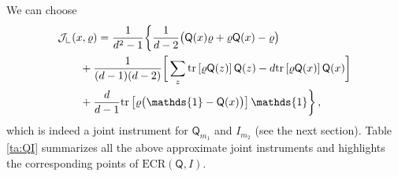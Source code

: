 \documentclass[12pt,reqno]{amsart}
\theoremstyle{definition}
\newcommand{\tr}[1]{{\rm tr}\left[#1\right]} %
\newcommand{\id}{\mathds{1}} %
\newcommand{\Qo}{\mathsf{Q}}%
\newcommand{\Lcorner}{{\mathchoice{\mathrel{\makebox[7pt][c]{\rule{.4pt}{7.5pt}\rule{5pt}{.4pt}}}}{\mathrel{\makebox[7pt][c]{\rule{.4pt}{7.5pt}\rule{5pt}{.4pt}}}}{\mathrel{\makebox[5.5pt][c]{\rule{.4pt}{5.25pt}\rule{3.5pt}{.4pt}}}}{\mathrel{\makebox[4pt][c]{\rule{.4pt}{3.75pt}\rule{2.5pt}{.4pt}}}}}}
\newcommand{\rhoo}{\varrho} %
\newcommand{\ii}{\mathcal{J}}
\newcommand{\ECR}[1]{\textrm{ECR} #1} %
\begin{document}
We can choose
\begin{equation}\label{eq:Jcorner}
\begin{aligned}
& \ii_\Lcorner(x,\rhoo) = \frac{1}{d^2-1} \bigg\{ \frac{1}{d-2}\big(\Qo(x)\rhoo+\rhoo\Qo(x)-\rhoo\big) \\
& \qquad + \frac{1}{(d-1)(d-2)}\bigg[ \sum_z\tr{\rhoo\Qo(z)}\Qo(z) - d\tr{\rhoo\Qo(x)}\Qo(x)\bigg] \\
& \qquad + \frac{d}{d-1}\tr{\rhoo\big(\id-\Qo(x)\big)}\id\bigg\}\,,
\end{aligned}
\end{equation}
which is indeed a joint instrument for $\Qo_{m_1}$ and $I_{m_2}$ (see the next section).
Table \ref{ta:QI} summarizes all the above approximate joint instruments and highlights the corresponding points of $\ECR{(\Qo,I)}$.
\end{document}
